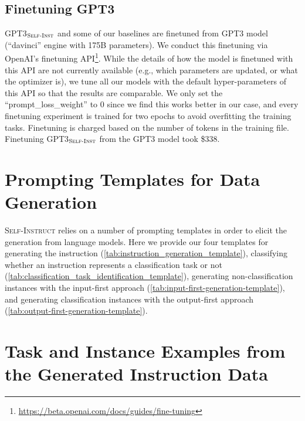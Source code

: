 \documentclass[11pt]{article}
\newcommand{\name}{\textsc{Self-Instruct}}
\newcommand{\gptthree}{\textsc{GPT3}}
\newcommand{\gptself}{\textsc{GPT3}$_{\textsc{Self-Inst}}$}
\begin{document}
\subsection{Finetuning GPT3}
\label{subsec:finetuning_details}
\gptself{} and some of our baselines are finetuned from \gptthree{} model (``davinci'' engine with 175B parameters). We conduct this finetuning via OpenAI's finetuning API\footnote{\url{https://beta.openai.com/docs/guides/fine-tuning}}. While the details of how the model is finetuned with this API are not currently available (e.g., which parameters are updated, or what the optimizer is), we tune all our models with the default hyper-parameters of this API so that the results are comparable. We only set the ``prompt\_loss\_weight'' to 0 since we find this works better in our case, and every finetuning experiment is trained for two epochs to avoid overfitting the training tasks. Finetuning is charged based on the number of tokens in the training file. Finetuning \gptself{} from the \gptthree{} model took \$338. 

\section{Prompting Templates for Data Generation}
\label{sec:prompting_templates}

\name{} relies on a number of prompting templates in order to elicit the generation from language models. Here we provide our four templates for generating the instruction (\autoref{tab:instruction_generation_template}), classifying whether an instruction represents a classification task or not (\autoref{tab:classification_task_identification_template}), generating non-classification instances with the input-first approach (\autoref{tab:input-first-generation-template}), and generating classification instances with the output-first approach (\autoref{tab:output-first-generation-template}).






\clearpage
\section{Task and Instance Examples from the Generated Instruction Data}


\end{document}
